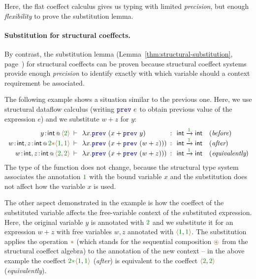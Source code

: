 Here, the flat coeffect calculus gives us typing with limited \emph{precision}, but
enough \emph{flexibility} to prove the substitution lemma.

\paragraph{Substitution for structural coeffects.}
By contrast, the substitution lemma (Lemma~\ref{thm:structural-substitution},
page~\pageref{thm:structural-substitution}) for structural coeffects can be proven because
structural coeffect systems provide enough \emph{precision} to identify exactly with which
variable should a context requirement be associated.

The following example shows a situation similar to the previous one. Here, we use
structural dataflow calculus (writing $\kvd{prev}~e$ to obtain previous value of the
expression $e$) and we substitute $w+z$ for $y$:
%
\begin{equation*}
\begin{array}{rclcll}
 \coctx{y\!:\!\ident{int}}{ \alift{\cclrd{2}} }
  &\narrow{\vdash}& \lambda x.\kvd{prev}~(x + \kvd{prev}~y) &\narrow{:}&
   \ident{int} \xrightarrow{\cclrd{ 1 }} \ident{int} & (\textit{before}) \\
\coctx{w\!:\!\ident{int}, z\!:\!\ident{int}}{\cclrd{2}\aclrd{\ast}\alift{\cclrd{1},\cclrd{1}}}
  &\narrow{\vdash}& \lambda x.\kvd{prev}~(x + \kvd{prev}~(w+z))) &\narrow{:}&
   \ident{int} \xrightarrow{\cclrd{ 1 }} \ident{int} & (\textit{after}) \\
\coctx{w\!:\!\ident{int}, z\!:\!\ident{int}}{\alift{\cclrd{2},\cclrd{2}}}
  &\narrow{\vdash}& \lambda x.\kvd{prev}~(x + \kvd{prev}~(w+z))) &\narrow{:}&
   \ident{int} \xrightarrow{\cclrd{ 1 }} \ident{int} & (\textit{equivalently})
\end{array}
\end{equation*}
%
The type of the function does not change, because the structural type system associates
the annotation $\cclrd{1}$ with the bound variable $x$ and the substitution does not
affect how the variable $x$ is used.

The other aspect demonstrated in the example is how the coeffect of the substituted
variable affects the free-variable context of the substituted expression. Here, the
original variable $y$ is annotated with $\cclrd{2}$ and we substitute it for an
expression $w+z$ with free variables $w,z$ annotated with $\alift{\cclrd{1}, \cclrd{1}}$.
The substitution applies the operation $\aclrd{\ast}$ (which stands for the sequential
composition $\aseq$ from the structural coeffect algebra) to the annotation of the new context --
in the above example the coeffect $\cclrd{2}\cclrd{\ast}\alift{\cclrd{1}, \cclrd{1}}$ (\emph{after}) is
equivalent to the coeffect $\alift{\cclrd{2}, \cclrd{2}}$ (\emph{equivalently}).

